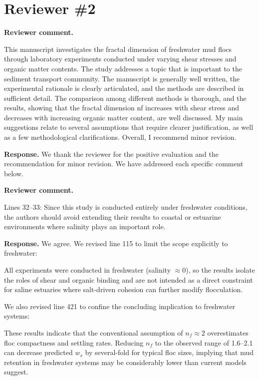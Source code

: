 \documentclass[11pt]{article}
\newenvironment{Snippet}{%
  \par\vspace{0.3em}\begin{list}{}{\setlength{\leftmargin}{1em}\setlength{\rightmargin}{0.5em}}\item\small\itshape
}{%
  \end{list}\vspace{0.3em}
}
\begin{document}
\section*{Reviewer \#2}
\begin{enumerate}[label=\textbf{R2.\arabic*.}]

\item \textbf{Reviewer comment.}
\begin{Snippet}
This manuscript investigates the fractal dimension of freshwater mud flocs through laboratory experiments conducted under varying shear stresses and organic matter contents. The study addresses a topic that is important to the sediment transport community. The manuscript is generally well written, the experimental rationale is clearly articulated, and the methods are described in sufficient detail. The comparison among different methods is thorough, and the results, showing that the fractal dimension nf increases with shear stress and decreases with increasing organic matter content, are well discussed. My main suggestions relate to several assumptions that require clearer justification, as well as a few methodological clarifications. Overall, I recommend minor revision.
\end{Snippet}
\textbf{Response.} We thank the reviewer for the positive evaluation and the recommendation for minor revision. We have addressed each specific comment below.

\item \textbf{Reviewer comment.}
\begin{Snippet}
Lines 32--33: Since this study is conducted entirely under freshwater conditions, the authors should avoid extending their results to coastal or estuarine environments where salinity plays an important role.
\end{Snippet}
\textbf{Response.} We agree. We revised line 115 to limit the scope explicitly to freshwater:
\begin{Snippet}
All experiments were conducted in freshwater (salinity $\approx 0$), so the results isolate the roles of shear and organic binding and are not intended as a direct constraint for saline estuaries where salt-driven cohesion can further modify flocculation.
\end{Snippet}
We also revised line 421 to confine the concluding implication to freshwater systems:
\begin{Snippet}
These results indicate that the conventional assumption of $n_f \approx 2$ overestimates floc compactness and settling rates. Reducing $n_f$ to the observed range of 1.6--2.1 can decrease predicted $w_s$ by several-fold for typical floc sizes, implying that mud retention in freshwater systems may be considerably lower than current models suggest.
\end{Snippet}


\end{enumerate}
\end{document}
